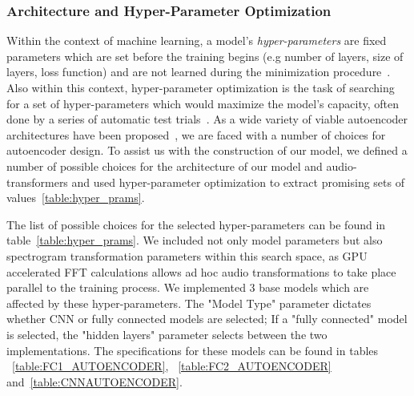 \documentclass[\main/thesis.tex]{subfiles}
\begin{document}
\subsubsection{Architecture and Hyper-Parameter Optimization}

Within the context of machine learning, a model's \emph{hyper-parameters} are fixed parameters which are set before the training begins (e.g number of layers, size of layers, loss function) and are not learned during the minimization procedure~\cite{bengio2000gradient}. Also within this context, hyper-parameter optimization is the task of searching for a set of hyper-parameters which would maximize the model's capacity, often done by a series of automatic test trials~\cite{bengio2000gradient,bergstra2011algorithms,bergstra2012random}. As a wide variety of viable autoencoder architectures have been proposed~\cite{aouameur2019neural,esling2018generative,gensler2016deep,zhang2016facing,pu2016variational}, we are faced with a number of choices for autoencoder design. To assist us with the construction of our model, we defined a number of possible choices for the architecture of our model and audio-transformers and used hyper-parameter optimization to extract promising sets of values~\ref{table:hyper_prams}. 

The list of possible choices for the selected hyper-parameters can be found in table~\ref{table:hyper_prams}. We included not only model parameters but also spectrogram transformation parameters within this search space, as GPU accelerated FFT calculations allows ad hoc audio transformations to take place parallel to the training process. We implemented 3 base models which are affected by these hyper-parameters. The "Model Type" parameter dictates whether CNN or fully connected models are selected; If a "fully connected" model is selected, the "hidden layers" parameter selects between the two implementations. The specifications for these models can be found in tables ~\ref{table:FC1_AUTOENCODER}, ~\ref{table:FC2_AUTOENCODER} and~\ref{table:CNNAUTOENCODER}.
\end{document}
